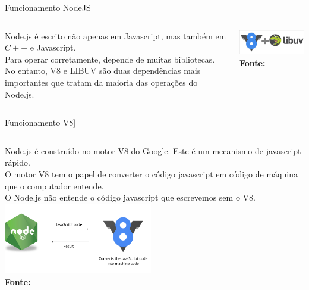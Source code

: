 \documentclass{beamer}
\begin{document}
    \begin{frame}{Funcionamento NodeJS}
      \begin{columns}[onlytextwidth]
          \alert{Node.js} é escrito não apenas em Javascript, mas também em $C++$ e Javascript. \\
          Para operar corretamente, depende de muitas bibliotecas. \\
          No entanto, V8 e LIBUV são duas dependências mais importantes que tratam da maioria das operações do Node.js.

            \includegraphics[width=55mm]{resources/aula1_6.png}\\
            \tiny{\textbf{Fonte:} \cite{ich2021}}

      \end{columns}
    \end{frame}
    
    \begin{frame}{Funcionamento V8]}
      \begin{columns}[onlytextwidth]
          Node.js é construído no motor V8 do Google. Este é um mecanismo de javascript rápido. \\
          O motor V8 tem o papel de converter o código javascript em código de máquina que o computador entende.\\
          \vspace{0.5cm}
	O Node.js não entende o código javascript que escrevemos sem o V8.
            \includegraphics[width=65mm]{resources/aula1_7.png}\\
            \tiny{\textbf{Fonte:} \cite{ich2021}}
      \end{columns}
    \end{frame}
    
\end{document}
